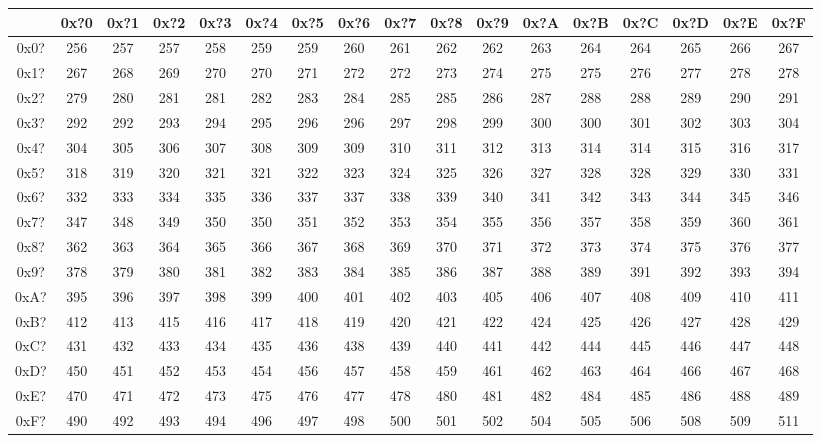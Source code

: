 {\ttfamily
\begin{tabular}{| c | c | c | c | c | c | c | c | c | c | c | c | c | c | c | c | c |}
\hline
& 0x?0 & 0x?1 & 0x?2 & 0x?3 & 0x?4 & 0x?5 & 0x?6 & 0x?7 & 0x?8 & 0x?9 & 0x?A & 0x?B & 0x?C & 0x?D & 0x?E & 0x?F \\
\hline
0x0? & 256 & 257 & 257 & 258 & 259 & 259 & 260 & 261 & 262 & 262 & 263 & 264 & 264 & 265 & 266 & 267 \\
0x1? & 267 & 268 & 269 & 270 & 270 & 271 & 272 & 272 & 273 & 274 & 275 & 275 & 276 & 277 & 278 & 278 \\
0x2? & 279 & 280 & 281 & 281 & 282 & 283 & 284 & 285 & 285 & 286 & 287 & 288 & 288 & 289 & 290 & 291 \\
0x3? & 292 & 292 & 293 & 294 & 295 & 296 & 296 & 297 & 298 & 299 & 300 & 300 & 301 & 302 & 303 & 304 \\
0x4? & 304 & 305 & 306 & 307 & 308 & 309 & 309 & 310 & 311 & 312 & 313 & 314 & 314 & 315 & 316 & 317 \\
0x5? & 318 & 319 & 320 & 321 & 321 & 322 & 323 & 324 & 325 & 326 & 327 & 328 & 328 & 329 & 330 & 331 \\
0x6? & 332 & 333 & 334 & 335 & 336 & 337 & 337 & 338 & 339 & 340 & 341 & 342 & 343 & 344 & 345 & 346 \\
0x7? & 347 & 348 & 349 & 350 & 350 & 351 & 352 & 353 & 354 & 355 & 356 & 357 & 358 & 359 & 360 & 361 \\
0x8? & 362 & 363 & 364 & 365 & 366 & 367 & 368 & 369 & 370 & 371 & 372 & 373 & 374 & 375 & 376 & 377 \\
0x9? & 378 & 379 & 380 & 381 & 382 & 383 & 384 & 385 & 386 & 387 & 388 & 389 & 391 & 392 & 393 & 394 \\
0xA? & 395 & 396 & 397 & 398 & 399 & 400 & 401 & 402 & 403 & 405 & 406 & 407 & 408 & 409 & 410 & 411 \\
0xB? & 412 & 413 & 415 & 416 & 417 & 418 & 419 & 420 & 421 & 422 & 424 & 425 & 426 & 427 & 428 & 429 \\
0xC? & 431 & 432 & 433 & 434 & 435 & 436 & 438 & 439 & 440 & 441 & 442 & 444 & 445 & 446 & 447 & 448 \\
0xD? & 450 & 451 & 452 & 453 & 454 & 456 & 457 & 458 & 459 & 461 & 462 & 463 & 464 & 466 & 467 & 468 \\
0xE? & 470 & 471 & 472 & 473 & 475 & 476 & 477 & 478 & 480 & 481 & 482 & 484 & 485 & 486 & 488 & 489 \\
0xF? & 490 & 492 & 493 & 494 & 496 & 497 & 498 & 500 & 501 & 502 & 504 & 505 & 506 & 508 & 509 & 511 \\
\hline
\end{tabular}
}

